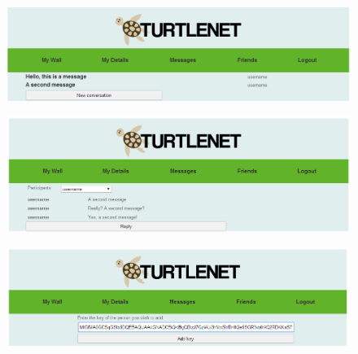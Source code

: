 \begin{centering}
\begin{figure}[p] \includegraphics[scale=0.5]{images/screenshots/crop11.png} \end{figure}
\begin{figure}[p] \includegraphics[scale=0.5]{images/screenshots/crop12.png} \end{figure}
\begin{figure}[p] \includegraphics[scale=0.5]{images/screenshots/crop13.png} \end{figure}
\end{centering}

